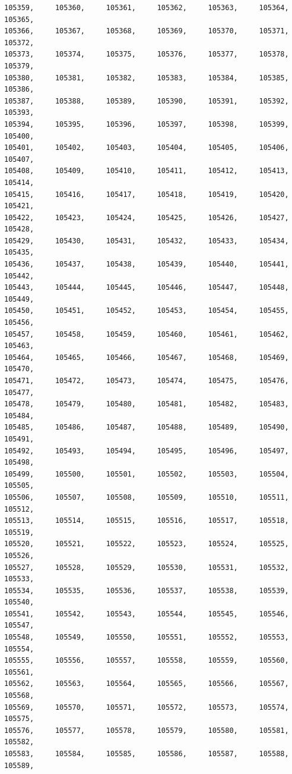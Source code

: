 \documentclass[a4paper,11pt]{report}
\begin{document}
\begin{verbatim}
105359,     105360,     105361,     105362,     105363,     105364,     105365,
105366,     105367,     105368,     105369,     105370,     105371,     105372,
105373,     105374,     105375,     105376,     105377,     105378,     105379,
105380,     105381,     105382,     105383,     105384,     105385,     105386,
105387,     105388,     105389,     105390,     105391,     105392,     105393,
105394,     105395,     105396,     105397,     105398,     105399,     105400,
105401,     105402,     105403,     105404,     105405,     105406,     105407,
105408,     105409,     105410,     105411,     105412,     105413,     105414,
105415,     105416,     105417,     105418,     105419,     105420,     105421,
105422,     105423,     105424,     105425,     105426,     105427,     105428,
105429,     105430,     105431,     105432,     105433,     105434,     105435,
105436,     105437,     105438,     105439,     105440,     105441,     105442,
105443,     105444,     105445,     105446,     105447,     105448,     105449,
105450,     105451,     105452,     105453,     105454,     105455,     105456,
105457,     105458,     105459,     105460,     105461,     105462,     105463,
105464,     105465,     105466,     105467,     105468,     105469,     105470,
105471,     105472,     105473,     105474,     105475,     105476,     105477,
105478,     105479,     105480,     105481,     105482,     105483,     105484,
105485,     105486,     105487,     105488,     105489,     105490,     105491,
105492,     105493,     105494,     105495,     105496,     105497,     105498,
105499,     105500,     105501,     105502,     105503,     105504,     105505,
105506,     105507,     105508,     105509,     105510,     105511,     105512,
105513,     105514,     105515,     105516,     105517,     105518,     105519,
105520,     105521,     105522,     105523,     105524,     105525,     105526,
105527,     105528,     105529,     105530,     105531,     105532,     105533,
105534,     105535,     105536,     105537,     105538,     105539,     105540,
105541,     105542,     105543,     105544,     105545,     105546,     105547,
105548,     105549,     105550,     105551,     105552,     105553,     105554,
105555,     105556,     105557,     105558,     105559,     105560,     105561,
105562,     105563,     105564,     105565,     105566,     105567,     105568,
105569,     105570,     105571,     105572,     105573,     105574,     105575,
105576,     105577,     105578,     105579,     105580,     105581,     105582,
105583,     105584,     105585,     105586,     105587,     105588,     105589,

\end{verbatim}
\end{document}
